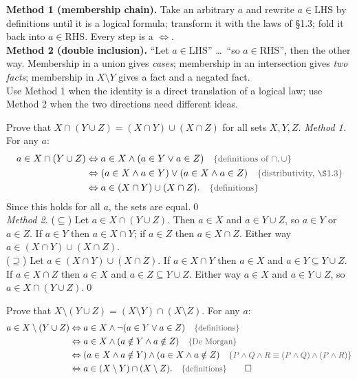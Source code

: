 \begin{strategy}
\textbf{Method 1 (membership chain).} Take an arbitrary $a$ and rewrite $a\in\text{LHS}$ by definitions until it is a logical formula; transform it with the laws of \S1.3; fold it back into $a\in\text{RHS}$. Every step is a $\Leftrightarrow$.\\
\textbf{Method 2 (double inclusion).} ``Let $a\in\text{LHS}$'' \dots\ ``so $a\in\text{RHS}$'', then the other way. Membership in a union gives \emph{cases}; membership in an intersection gives \emph{two facts}; membership in $X\setminus Y$ gives a fact and a negated fact.\\
Use Method 1 when the identity is a direct translation of a logical law; use Method 2 when the two directions need different ideas.
\end{strategy}

\begin{hexample}
Prove that $X\cap(Y\cup Z)=(X\cap Y)\cup(X\cap Z)$ for all sets $X,Y,Z$.
\solution
\emph{Method 1.} For any $a$:
\begin{align*}
a\in X\cap(Y\cup Z)&\Leftrightarrow a\in X\wedge(a\in Y\vee a\in Z)\reason{definitions of $\cap,\cup$}\\
&\Leftrightarrow(a\in X\wedge a\in Y)\vee(a\in X\wedge a\in Z)\reason{distributivity, \S1.3}\\
&\Leftrightarrow a\in(X\cap Y)\cup(X\cap Z).\reason{definitions}
\end{align*}
Since this holds for all $a$, the sets are equal.\qed\\[3pt]
\emph{Method 2.} ($\subseteq$) Let $a\in X\cap(Y\cup Z)$. Then $a\in X$ and $a\in Y\cup Z$, so $a\in Y$ or $a\in Z$. If $a\in Y$ then $a\in X\cap Y$; if $a\in Z$ then $a\in X\cap Z$. Either way $a\in(X\cap Y)\cup(X\cap Z)$.\\
($\supseteq$) Let $a\in(X\cap Y)\cup(X\cap Z)$. If $a\in X\cap Y$ then $a\in X$ and $a\in Y\subseteq Y\cup Z$. If $a\in X\cap Z$ then $a\in X$ and $a\in Z\subseteq Y\cup Z$. Either way $a\in X$ and $a\in Y\cup Z$, so $a\in X\cap(Y\cup Z)$.\qed
\end{hexample}

\begin{hexample}
Prove that $X\setminus(Y\cup Z)=(X\setminus Y)\cap(X\setminus Z)$.
\solution
For any $a$:
\begin{align*}
a\in X\setminus(Y\cup Z)&\Leftrightarrow a\in X\wedge\neg(a\in Y\vee a\in Z)\reason{definitions}\\
&\Leftrightarrow a\in X\wedge(a\notin Y\wedge a\notin Z)\reason{De Morgan}\\
&\Leftrightarrow(a\in X\wedge a\notin Y)\wedge(a\in X\wedge a\notin Z)\reason{$P\wedge Q\wedge R\equiv(P\wedge Q)\wedge(P\wedge R)$}\\
&\Leftrightarrow a\in(X\setminus Y)\cap(X\setminus Z).\reason{definitions}\qquad\square
\end{align*}
\end{hexample}

